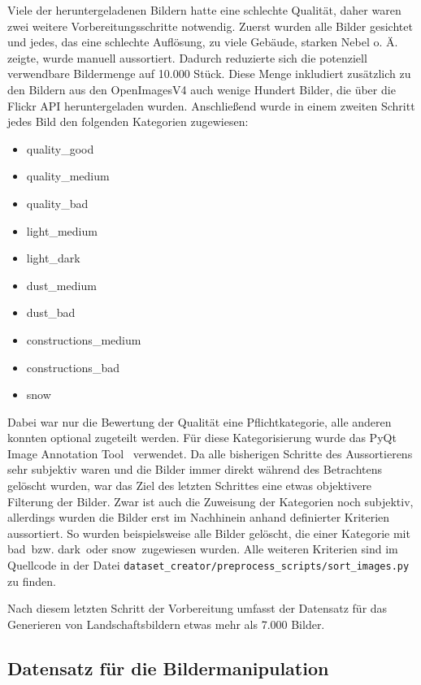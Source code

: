 Viele der heruntergeladenen Bildern hatte eine schlechte Qualität, daher waren
zwei weitere Vorbereitungsschritte notwendig. Zuerst wurden alle Bilder
gesichtet und jedes, das eine schlechte Auflösung, zu viele Gebäude, starken
Nebel o. Ä. zeigte, wurde manuell aussortiert. Dadurch reduzierte sich die
potenziell verwendbare Bildermenge auf 10.000 Stück. Diese Menge inkludiert
zusätzlich zu den Bildern aus den OpenImagesV4 auch wenige Hundert Bilder, die
über die Flickr API heruntergeladen wurden. Anschließend wurde in einem zweiten
Schritt jedes Bild den folgenden Kategorien zugewiesen:

\begin{itemize}
	\item quality\_good
	\item quality\_medium
	\item quality\_bad
	\item light\_medium
	\item light\_dark
	\item dust\_medium
	\item dust\_bad
	\item constructions\_medium
	\item constructions\_bad
	\item snow
\end{itemize}

Dabei war nur die Bewertung der Qualität eine Pflichtkategorie, alle anderen
konnten optional zugeteilt werden. Für diese Kategorisierung wurde das \glqq
PyQt Image Annotation Tool\grqq~\cite{brada2022} verwendet. Da alle bisherigen
Schritte des Aussortierens sehr subjektiv waren und die Bilder immer direkt
während des Betrachtens gelöscht wurden, war das Ziel des letzten Schrittes eine
etwas objektivere Filterung der Bilder. Zwar ist auch die Zuweisung der
Kategorien noch subjektiv, allerdings wurden die Bilder erst im Nachhinein
anhand definierter Kriterien aussortiert. So wurden beispielsweise alle Bilder
gelöscht, die einer Kategorie mit \glqq bad\grqq\ bzw. \glqq dark\grqq\ oder
\glqq snow\grqq\ zugewiesen wurden. Alle weiteren Kriterien sind im Quellcode in
der Datei \texttt{dataset\_creator/preprocess\_scripts/sort\_images.py} zu
finden.

Nach diesem letzten Schritt der Vorbereitung umfasst der Datensatz für das
Generieren von Landschaftsbildern etwas mehr als 7.000 Bilder.

\subsection{Datensatz für die Bildermanipulation}

